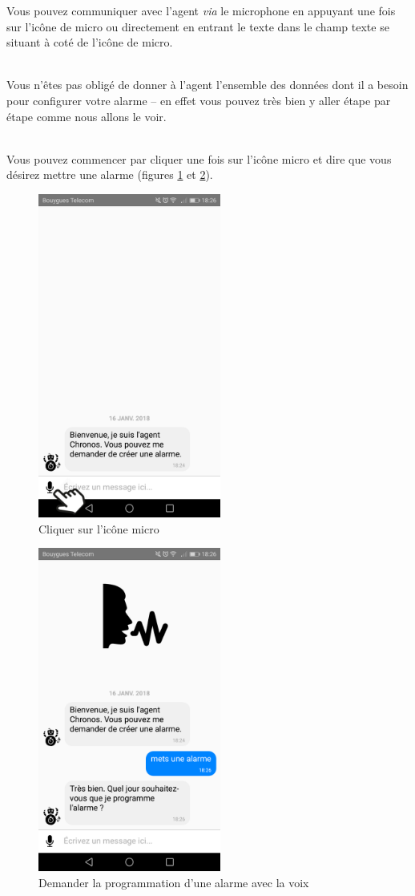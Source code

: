 Vous pouvez communiquer avec l'agent \emph{via} le microphone en appuyant une fois sur l'icône de micro
ou directement en entrant le texte dans le champ texte se situant à coté de l'icône de micro. 

~\\\indent Vous n'êtes pas obligé de donner à l'agent l'ensemble des données
dont il a besoin pour configurer votre alarme \--- en effet vous pouvez très bien y aller étape par étape comme nous allons le voir. 

~\\\indent Vous pouvez commencer par cliquer
une fois sur l'icône micro et dire que vous désirez mettre une alarme (figures \ref{B} et \ref{C}).

\begin{figure}[H]
  \centering
  \includegraphics[width=6cm]{images/B.png}
  \caption{Cliquer sur l'icône micro}
  \label{B}
\end{figure}

\begin{figure}[H]
  \centering
  \includegraphics[width=6cm]{images/C.png}
  \caption{Demander la programmation d'une alarme avec la voix}
  \label{C}
\end{figure}

